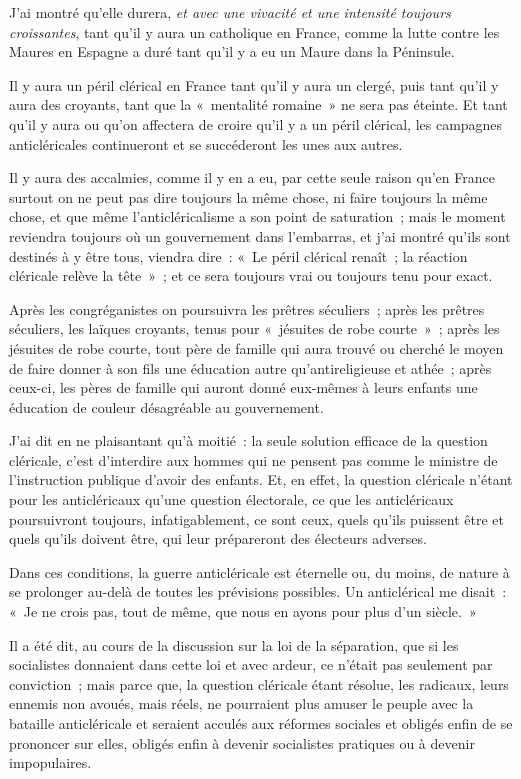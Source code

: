 \documentclass[french,twoside]{book} %
\begin{document}
\noindent J’ai montré qu’elle durera, {\itshape et avec une vivacité et une intensité toujours croissantes}, tant qu’il y aura un catholique en France, comme la lutte contre les Maures en Espagne a duré tant qu’il y a eu un Maure dans la Péninsule.\par
Il y aura un péril clérical en France tant qu’il y aura un clergé, puis tant qu’il y aura des croyants,  tant que la « mentalité romaine » ne sera pas éteinte. Et tant qu’il y aura ou qu’on affectera de croire qu’il y a un péril clérical, les campagnes anticléricales continueront et se succéderont les unes aux autres.\par
Il y aura des accalmies, comme il y en a eu, par cette seule raison qu’en France surtout on ne peut pas dire toujours la même chose, ni faire toujours la même chose, et que même l’anticléricalisme a son point de saturation ; mais le moment reviendra toujours où un gouvernement dans l’embarras, et j’ai montré qu’ils sont destinés à y être tous, viendra dire : « Le péril clérical renaît ; la réaction cléricale relève la tête » ; et ce sera toujours vrai ou toujours tenu pour exact.\par
Après les congréganistes on poursuivra les prêtres séculiers ; après les prêtres séculiers, les laïques croyants, tenus pour « jésuites de robe courte » ; après les jésuites de robe courte, tout père de famille qui aura trouvé ou cherché le moyen de faire donner à son fils une éducation autre qu’antireligieuse et athée ; après ceux-ci, les pères de famille qui auront donné eux-mêmes à leurs enfants une éducation de couleur désagréable au gouvernement.\par
J’ai dit en ne plaisantant qu’à moitié : la seule solution efficace de la question cléricale, c’est  d’interdire aux hommes qui ne pensent pas comme le ministre de l’instruction publique d’avoir des enfants. Et, en effet, la question cléricale n’étant pour les anticléricaux qu’une question électorale, ce que les anticléricaux poursuivront toujours, infatigablement, ce sont ceux, quels qu’ils puissent être et quels qu’ils doivent être, qui leur prépareront des électeurs adverses.\par
Dans ces conditions, la guerre anticléricale est éternelle ou, du moins, de nature à se prolonger au-delà de toutes les prévisions possibles. Un anticlérical me disait : « Je ne crois pas, tout de même, que nous en ayons pour plus d’un siècle. »\par
Il a été dit, au cours de la discussion sur la loi de la séparation, que si les socialistes donnaient dans cette loi et avec ardeur, ce n’était pas seulement par conviction ; mais parce que, la question cléricale étant résolue, les radicaux, leurs ennemis non avoués, mais réels, ne pourraient plus amuser le peuple avec la bataille anticléricale et seraient acculés aux réformes sociales et obligés enfin de se prononcer sur elles, obligés enfin à devenir socialistes pratiques ou à devenir impopulaires.\par
\end{document}
